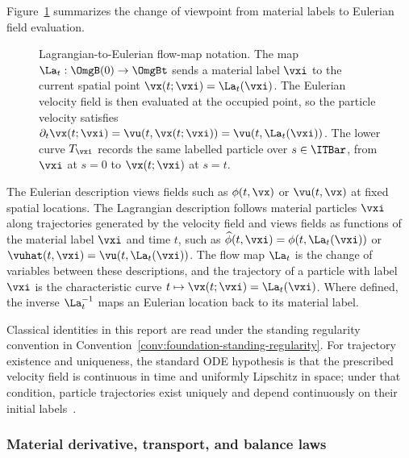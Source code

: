 Figure~\ref{fig:lagrangian-eulerian-map} summarizes the change of viewpoint
from material labels to Eulerian field evaluation.

\begin{figure}[!htb]
    \centering
    \captionsetup{aboveskip=2pt,belowskip=2pt}
    \caption{%
        Lagrangian-to-Eulerian flow-map notation. The map
        $\La_t:\OmgB(0)\to\OmgBt$ sends a material label $\vxi$
        to the current spatial point $\vx(t;\vxi)=\La_t(\vxi)$.
        The Eulerian velocity field is then evaluated at the occupied point,
        so the particle velocity satisfies
        $\partial_t\vx(t;\vxi)=\vu(t,\vx(t;\vxi))=\vu(t,\La_t(\vxi))$.
        The lower curve $T_{\vxi}$ records the same labelled particle over
        $s\in\ITBar$, from $\vxi$ at $s=0$ to $\vx(t;\vxi)$ at $s=t$.}
    \label{fig:lagrangian-eulerian-map}
\end{figure}

\begin{remark}
    \label{rmk:eulerian-lagrangian}
    The Eulerian description views fields such as $\phi(t,\vx)$ or
    $\vu(t,\vx)$ at fixed spatial locations. The Lagrangian description follows
    material particles $\vxi$ along trajectories generated by the velocity field
    and views fields as functions of the material label $\vxi$ and time $t$,
    such as $\widehat{\phi}(t,\vxi)=\phi(t,\La_t(\vxi))$ or
    $\vuhat(t,\vxi)=\vu(t,\La_t(\vxi))$. The flow map $\La_t$ is the change of
    variables between these descriptions, and the trajectory of a particle with
    label $\vxi$ is the characteristic curve
    $t\mapsto \vx(t;\vxi)=\La_t(\vxi)$. Where defined, the inverse
    $\La_t^{-1}$ maps an Eulerian location back to its material label.
\end{remark}

Classical identities in this report are read under the standing regularity
convention in Convention~\ref{conv:foundation-standing-regularity}. For
trajectory existence and uniqueness, the standard ODE hypothesis is that the
prescribed velocity field is continuous in time and uniformly Lipschitz in
space; under that condition, particle trajectories exist uniquely and depend
continuously on their initial
labels~\cite[Ch.~2]{Teschl2012OrdinaryDifferentialEquations}.

\subsubsection{Material derivative, transport, and balance laws}

